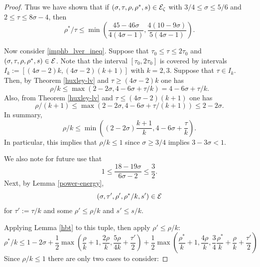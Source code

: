 \begin{proof}
Thus we have shown that if $(\sigma, \tau, \rho, \rho^*, s) \in \mathcal{E}_\zeta$ with $3/4 \le \sigma \le 5/6$ and $2 \le \tau \le 8\sigma - 4$, then 
\[
\rho^*/\tau \le \min\left(\frac{45 - 46\sigma}{4(4\sigma - 1)}, \frac{4(10 - 9\sigma)}{5(4\sigma - 1)}\right).
\]

Now consider \eqref{imphb_lver_ineq}. Suppose that $\tau_0 \le \tau \le 2\tau_0$ and $(\sigma, \tau, \rho, \rho^*, s) \in \mathcal{E}$. Note that the interval $[\tau_0, 2\tau_0]$ is covered by intervals $I_k := [(4\sigma - 2)k, (4\sigma - 2)(k + 1)]$ with $k = 2, 3$. Suppose that $\tau \in I_k$. Then, by Theorem \ref{huxley-lv} and $\tau \ge (4\sigma - 2)k$ one has
\[
\rho/k \le \max(2 - 2\sigma, 4 - 6\sigma + \tau/k) = 4 - 6\sigma + \tau/k.
\]
Also, from Theorem \ref{huxley-lv} and $\tau \le (4\sigma - 2)(k + 1)$ one has
\[
\rho/(k + 1) \le \max(2 - 2\sigma, 4 - 6\sigma + \tau/(k + 1)) \le 2 - 2\sigma.
\]
In summary,
\begin{equation}\label{ze_ihb_rho_bound_k}
\rho/k \le \min((2 - 2\sigma)\frac{k + 1}{k}, 4 - 6\sigma + \frac{\tau}{k}).
\end{equation}
In particular, this implies that $\rho/k \le 1$ since $\sigma \ge 3/4$ implies $3 - 3\sigma < 1$.

We also note for future use that 
\begin{equation}\label{ze_ihb_bound_tau_factor}
1 \le \frac{18 - 19\sigma}{6\sigma - 2} \le \frac{3}{2}.
\end{equation}
Next, by Lemma \ref{power-energy}, 
\[
(\sigma, \tau', \rho', \rho^*/k, s') \in \mathcal{E}
\]
for $\tau' := \tau/k$ and some $\rho' \le \rho/k$ and $s' \le s/k$. 

Applying Lemma \ref{hbt} to this tuple, then apply $\rho' \le \rho/k$:
\[
\rho^*/k \leq 1-2\sigma + \frac{1}{2}\max(\frac{\rho}{k}+1, \frac{2\rho}{k}, \frac{5\rho}{4k} + \frac{\tau'}{2}) + \frac{1}{2}\max(\frac{\rho^*}{k}+1, \frac{4\rho}{k}, \frac{3}{4}\frac{\rho^*}{k} +\frac{\rho}{k}+\frac{\tau'}{2})
\]
Since $\rho/k \le 1$ there are only two cases to consider:


\end{proof}
